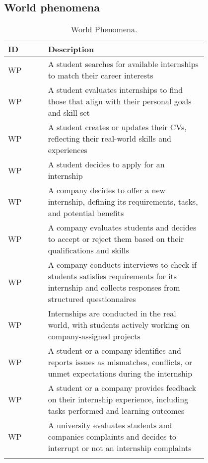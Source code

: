 \subsection{World phenomena}
\label{subsec:world_phenomena}%
\setcounter{wp}{1}
\newcommand{\cwp}{\thewp\stepcounter{wp}}
\begin{center}
    \renewcommand{\arraystretch}{2}
    \begin{longtable}{ l p{0.8\linewidth} } 
        \hline
        \textbf{ID} & \textbf{Description}                                                \\
        \hline
        WP\cwp      & A student searches for available internships to match their career interests \\
        \hline
        WP\cwp      & A student evaluates internships to find those that align with their personal goals and skill set \\
        \hline
        WP\cwp      & A student creates or updates their CVs, reflecting their real-world skills and experiences \\
        \hline
        WP\cwp      & A student decides to apply for an internship \\
        \hline
        WP\cwp      & A company decides to offer a new internship, defining its requirements, tasks, and potential benefits \\
        \hline
        WP\cwp      & A company evaluates students and decides to accept or reject them based on their qualifications and skills \\
        \hline
        WP\cwp      & A company conducts interviews to check if students satisfies requirements for its internship and collects responses from structured questionnaires \\
        \hline
        WP\cwp      & Internships are conducted in the real world, with students actively working on company-assigned projects \\
        \hline
        WP\cwp      & A student or a company identifies and reports issues as mismatches, conflicts, or unmet expectations during the internship \\
        \hline
        WP\cwp      & A student or a company provides feedback on their internship experience, including tasks performed and learning outcomes \\
        \hline
        WP\cwp      & A university evaluates students and companies complaints and decides to interrupt or not an internship complaints \\
        \hline
        \caption{World Phenomena.}
        \label{tab:worldph_tab}%
    \end{longtable}
\end{center}

